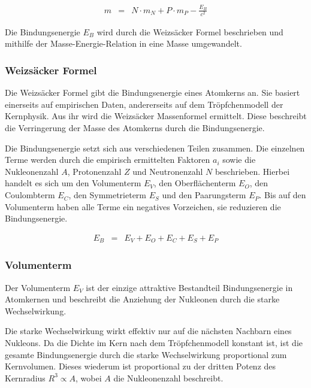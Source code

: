 \documentclass[12pt,a4paper]{scrartcl}
\numberwithin{equation}{section} %
\renewcommand{\[}{} %
\renewcommand{\]}{\noindent} %
\begin{document}
\[
\begin{eqnarray}
        m &=& N\cdot m_N + P\cdot m_P - \frac{E_B}{c^2}
\end{eqnarray}
\]

Die Bindungsenergie $E_B$ wird durch die Weizsäcker Formel beschrieben
und mithilfe der Masse-Energie-Relation in eine Masse umgewandelt.

\hypertarget{weizsuxe4cker-formel}{%
\subsubsection{Weizsäcker Formel}\label{weizsuxe4cker-formel}}

Die Weizsäcker Formel gibt die Bindungsenergie eines Atomkerns an. Sie
basiert einerseits auf empirischen Daten, andererseits auf dem
Tröpfchenmodell der Kernphysik. Aus ihr wird die Weizsäcker Massenformel
ermittelt. Diese beschreibt die Verringerung der Masse des Atomkerns
durch die Bindungsenergie.

Die Bindungsenergie setzt sich aus verschiedenen Teilen zusammen. Die
einzelnen Terme werden durch die empirisch ermittelten Faktoren $a_i$
sowie die Nukleonenzahl $A$, Protonenzahl $Z$ und Neutronenzahl
$N$ beschrieben. Hierbei handelt es sich um den Volumenterm $E_V$,
den Oberflächenterm $E_O$, den Coulombterm $E_C$, den Symmetrieterm
$E_S$ und den Paarungsterm $E_P$. Bis auf den Volumenterm haben alle
Terme ein negatives Vorzeichen, sie reduzieren die Bindungsenergie.

\[
\begin{eqnarray}
        E_B &=& E_V + E_O + E_C + E_S + E_P
\end{eqnarray}
\]

\hypertarget{volumenterm}{%
\subsubsection{Volumenterm}\label{volumenterm}}

Der Volumenterm $E_V$ ist der einzige attraktive Bestandteil
Bindungsenergie in Atomkernen und beschreibt die Anziehung der Nukleonen
durch die starke Wechselwirkung.

Die starke Wechselwirkung wirkt effektiv nur auf die nächsten Nachbarn
eines Nukleons. Da die Dichte im Kern nach dem Tröpfchenmodell konstant
ist, ist die gesamte Bindungsenergie durch die starke Wechselwirkung
proportional zum Kernvolumen. Dieses wiederum ist proportional zu der
dritten Potenz des Kernradius $R^3\propto A$, wobei $A$ die
Nukleonenzahl beschreibt.
\end{document}
